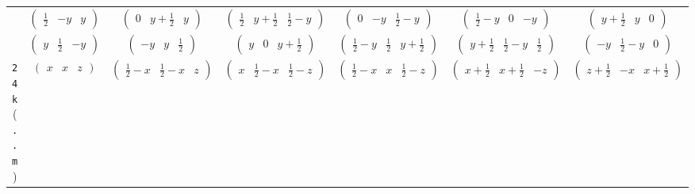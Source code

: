 \documentclass[fleqn,9pt,landscape]{jsarticle}
\begin{document}
\begin{center}
\begin{longtable}{ccccccc}
& $ \begin{pmatrix} \frac{1}{2} & - y & y \end{pmatrix} $ & $ \begin{pmatrix} 0 & y + \frac{1}{2} & y \end{pmatrix} $ & $ \begin{pmatrix} \frac{1}{2} & y + \frac{1}{2} & \frac{1}{2} - y \end{pmatrix} $ & $ \begin{pmatrix} 0 & - y & \frac{1}{2} - y \end{pmatrix} $ & $ \begin{pmatrix} \frac{1}{2} - y & 0 & - y \end{pmatrix} $ & $ \begin{pmatrix} y + \frac{1}{2} & y & 0 \end{pmatrix} $ \\
& $ \begin{pmatrix} y & \frac{1}{2} & - y \end{pmatrix} $ & $ \begin{pmatrix} - y & y & \frac{1}{2} \end{pmatrix} $ & $ \begin{pmatrix} y & 0 & y + \frac{1}{2} \end{pmatrix} $ & $ \begin{pmatrix} \frac{1}{2} - y & \frac{1}{2} & y + \frac{1}{2} \end{pmatrix} $ & $ \begin{pmatrix} y + \frac{1}{2} & \frac{1}{2} - y & \frac{1}{2} \end{pmatrix} $ & $ \begin{pmatrix} - y & \frac{1}{2} - y & 0 \end{pmatrix} $ \\ \hline
{\tt 24k} ({\tt ..m}) & $ \begin{pmatrix} x & x & z \end{pmatrix} $ & $ \begin{pmatrix} \frac{1}{2} - x & \frac{1}{2} - x & z \end{pmatrix} $ & $ \begin{pmatrix} x & \frac{1}{2} - x & \frac{1}{2} - z \end{pmatrix} $ & $ \begin{pmatrix} \frac{1}{2} - x & x & \frac{1}{2} - z \end{pmatrix} $ & $ \begin{pmatrix} x + \frac{1}{2} & x + \frac{1}{2} & - z \end{pmatrix} $ & $ \begin{pmatrix} z + \frac{1}{2} & - x & x + \frac{1}{2} \end{pmatrix} $ \\

\end{longtable}
\end{center}
\end{document}
